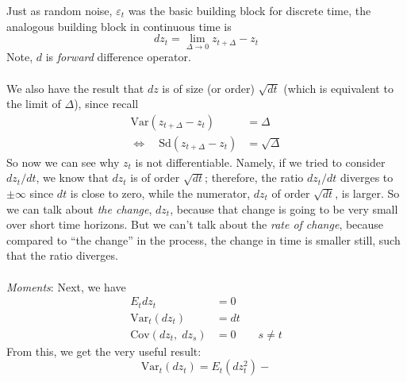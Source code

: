 \documentclass[a4paper,12pt]{scrartcl}
\begin{document}
Just as random noise, $\varepsilon_t$ was the basic building block
for discrete time, the analogous building block in continuous time is
\begin{equation}
    dz_t = \lim_{\Delta \rightarrow 0} z_{t + \Delta} - z_t
\end{equation}
Note, $d$ is \emph{forward} difference operator.
\\
\\
We also have the result that $dz$ is of size (or order) $\sqrt{dt}$ 
(which is equivalent to the limit of $\Delta$), since recall
\begin{align*}
    \text{Var}(z_{t + \Delta} - z_t) &= \Delta \\
    \Leftrightarrow \quad \text{Sd}(z_{t + \Delta} - z_t) &= 
	\sqrt{\Delta}
\end{align*}
So now we can see why $z_t$ is not differentiable.  Namely, if 
we tried to consider $dz_t/dt$, we know that $dz_t$ is of order
$\sqrt{dt}$; therefore, the ratio $dz_t/dt$ diverges to $\pm \infty$
since $dt$ is close to zero, while the numerator, $dz_t$ of order
$\sqrt{dt}$, is larger. So we can talk about \emph{the change}, $dz_t$,
because that change is going to be very small over short time horizons.
But we can't talk about the \emph{rate of change}, because compared
to ``the change'' in the process, the change in time is smaller still,
such that the ratio diverges.
\\
\\
{\sl Moments}: Next, we have
\begin{align*}
    E_t dz_t &= 0 \\
    \text{Var}_t(dz_t) &= dt \\
    \text{Cov}(dz_t, \; dz_s) &= 0 \qquad s\neq t
\end{align*}
From this, we get the very useful result:
\begin{equation}
    \text{Var}_t(dz_t) = E_t(dz^2_t) - 
\end{equation}






% 
\end{document}
